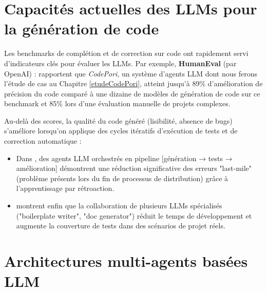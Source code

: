 \section{Capacités actuelles des LLMs pour la génération de code}

Les benchmarks de complétion et de correction sur code ont rapidement servi d’indicateurs clés pour évaluer les LLMs.
Par exemple, \textbf{HumanEval} (par OpenAI) : \textcite{rasheed_codepori_2024} rapportent que \emph{CodePori}, un système d’agents LLM dont nous ferons l'étude de cas au Chapitre \ref{etudeCodePori}, atteint jusqu’à 89\% d'amélioration de précision du code comparé à une dizaine de modèles de génération de code sur ce benchmark et 85\% lors d’une évaluation manuelle de projets complexes.    

Au-delà des scores, la qualité du code généré (lisibilité, absence de bugs) s’améliore lorsqu’on applique des cycles itératifs d’exécution de tests et de correction automatique :  
\begin{itemize}
  \item Dans \textcite{vallecillos_ruiz_agent-driven_2024}, des agents LLM orchestrés en pipeline [génération → tests → amélioration] démontrent une réduction significative des erreurs "last-mile" (problème présents lors du fin de processus de distribution) grâce à l’apprentissage par rétroaction.  
  \item \textcite{zahid_multi-agent_2024} montrent enfin que la collaboration de plusieurs LLMs spécialisés ("boilerplate writer", "doc generator") réduit le temps de développement et augmente la couverture de tests dans des scénarios de projet réels.  
\end{itemize}


\section{Architectures multi-agents basées LLM}

